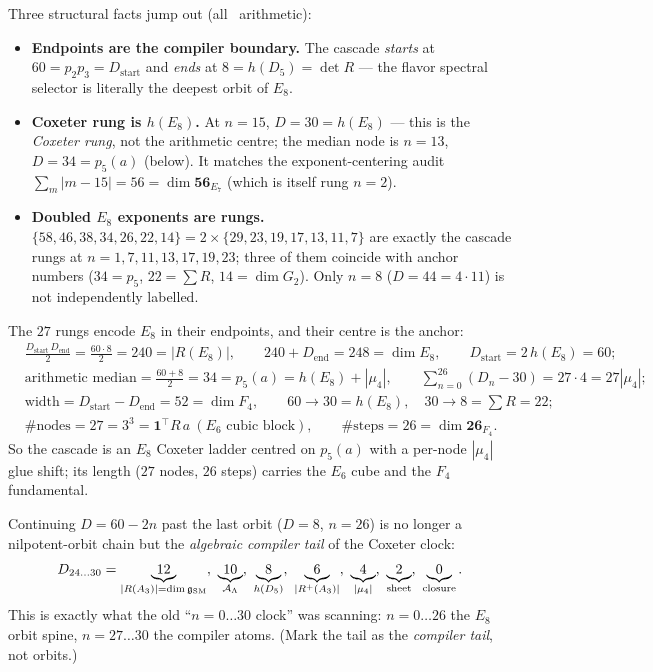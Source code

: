 \noindent Three structural facts jump out (all \mE\ arithmetic):
\begin{itemize}[leftmargin=1.4em]
\item \textbf{Endpoints are the compiler boundary.} The cascade \emph{starts} at $60=p_2p_3=D_{\mathrm{start}}$
      and \emph{ends} at $8=h(D_5)=\det R$ --- the flavor spectral selector is literally the deepest
      orbit of $E_8$.
\item \textbf{Coxeter rung is $h(E_8)$.} At $n=15$, $D=30=h(E_8)$ --- this is the \emph{Coxeter rung},
      not the arithmetic centre; the median node is $n=13$, $D=34=p_5(a)$ (below). It matches the
      exponent-centering audit
      $\sum_{m}|m-15|=56=\dim\mathbf{56}_{E_7}$ (which is itself rung $n=2$).
\item \textbf{Doubled $E_8$ exponents are rungs.} $\{58,46,38,34,26,22,14\}=2\times\{29,23,19,17,13,11,7\}$
      are exactly the cascade rungs at $n=1,7,11,13,17,19,23$; three of them coincide with anchor numbers
      ($34=p_5$, $22=\sum R$, $14=\dim G_2$). Only $n=8$ ($D=44=4\cdot11$) is not independently labelled.
\end{itemize}

\begin{winbox}
The $27$ rungs encode $E_8$ in their endpoints, and their centre is the anchor:
\begin{align*}
  &\tfrac{D_{\mathrm{start}}\,D_{\mathrm{end}}}{2}=\tfrac{60\cdot8}{2}=240=|R(E_8)|,\qquad
  240+D_{\mathrm{end}}=248=\dim E_8,\qquad D_{\mathrm{start}}=2\,h(E_8)=60;\\
  &\text{arithmetic median}=\tfrac{60+8}{2}=34=p_5(a)=h(E_8)+|\mu_4|,\qquad
  \textstyle\sum_{n=0}^{26}(D_n-30)=27\cdot4=27|\mu_4|;\\
  &\text{width}=D_{\mathrm{start}}-D_{\mathrm{end}}=52=\dim F_4,\qquad
  60\!\to\!30=h(E_8),\quad 30\!\to\!8=\textstyle\sum R=22;\\
  &\#\text{nodes}=27=3^3=\mathbf 1^\top R\,a\ (E_6\text{ cubic block}),\qquad
  \#\text{steps}=26=\dim\mathbf{26}_{F_4}.
\end{align*}
So the cascade is an $E_8$ Coxeter ladder centred on $p_5(a)$ with a per-node $|\mu_4|$ glue shift; its
length ($27$ nodes, $26$ steps) carries the $E_6$ cube and the $F_4$ fundamental. \mE
\end{winbox}

\begin{keybox}[The IR tail $n=24\ldots30$: the compiler atoms]
Continuing $D=60-2n$ past the last orbit ($D{=}8$, $n{=}26$) is no longer a nilpotent-orbit chain but the
\emph{algebraic compiler tail} of the Coxeter clock:
\[
  D_{24\ldots30}=\underbrace{12}_{|R(A_3)|=\dim\mathfrak g_{\mathrm{SM}}},\
  \underbrace{10}_{\AL},\ \underbrace{8}_{h(D_5)},\
  \underbrace{6}_{|R^+(A_3)|},\ \underbrace{4}_{|\mu_4|},\ \underbrace{2}_{\text{sheet}},\ \underbrace{0}_{\text{closure}} .
\]
This is exactly what the old ``$n=0\ldots30$ clock'' was scanning: $n{=}0\ldots26$ the $E_8$ orbit spine,
$n{=}27\ldots30$ the compiler atoms. (Mark the tail as the \emph{compiler tail}, not orbits.) \mE
\end{keybox}

